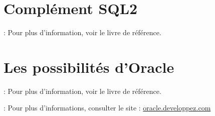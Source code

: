\documentclass[10pt]{beamer}
\begin{document}
\section{Complément SQL2}
\begin{frame}{\secname : \subsecname}
    Pour plus d'information, voir le livre de référence.
\end{frame}

\section{Les possibilités d'Oracle}
\begin{frame}{\secname : \subsecname}
    Pour plus d'information, voir le livre de référence.
\end{frame}

\begin{frame}{\secname : \subsecname}
    Pour plus d'informations, consulter le site :
    \href{http://oracle.developpez.com/guide/administration/adminrole/}{oracle.developpez.com}
\end{frame}


\end{document}
